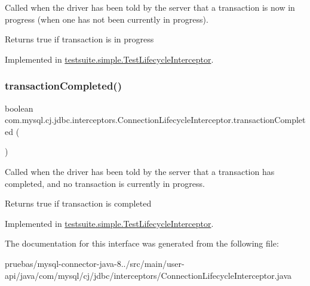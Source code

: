 Called when the driver has been told by the server that a transaction is now in progress (when one has not been currently in progress).

\begin{DoxyReturn}{Returns}
true if transaction is in progress 
\end{DoxyReturn}


Implemented in \mbox{\hyperlink{classtestsuite_1_1simple_1_1_test_lifecycle_interceptor_a5ca18da030f4569891254990898f9c1b}{testsuite.\+simple.\+Test\+Lifecycle\+Interceptor}}.

\mbox{\label{interfacecom_1_1mysql_1_1cj_1_1jdbc_1_1interceptors_1_1_connection_lifecycle_interceptor_a53811dd190160d999a9e217cf9208a84}} 
\subsubsection{\texorpdfstring{transaction\+Completed()}{transactionCompleted()}}
{\footnotesize\ttfamily boolean com.\+mysql.\+cj.\+jdbc.\+interceptors.\+Connection\+Lifecycle\+Interceptor.\+transaction\+Completed (\begin{DoxyParamCaption}{ }\end{DoxyParamCaption})}

Called when the driver has been told by the server that a transaction has completed, and no transaction is currently in progress.

\begin{DoxyReturn}{Returns}
true if transaction is completed 
\end{DoxyReturn}


Implemented in \mbox{\hyperlink{classtestsuite_1_1simple_1_1_test_lifecycle_interceptor_a00973c1a52ebc81176be2b9a46f5aa66}{testsuite.\+simple.\+Test\+Lifecycle\+Interceptor}}.



The documentation for this interface was generated from the following file\+:\begin{DoxyCompactItemize}
\item 
pruebas/mysql-\/connector-\/java-\/8../src/main/user-\/api/java/com/mysql/cj/jdbc/interceptors/Connection\+Lifecycle\+Interceptor.\+java\end{DoxyCompactItemize}
